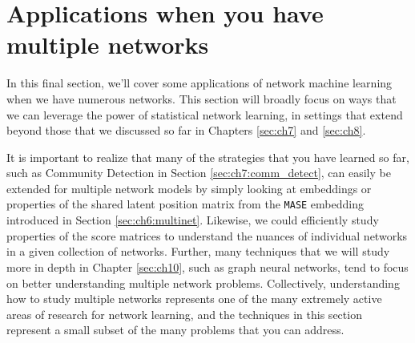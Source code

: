 \chapter{Applications when you have multiple networks}
\label{sec:ch9}

In this final section, we'll cover some applications of network machine learning when we have numerous networks. This section will broadly focus on ways that we can leverage the power of statistical network learning, in settings that extend beyond those that we discussed so far in Chapters \ref{sec:ch7} and \ref{sec:ch8}. 

It is important to realize that many of the strategies that you have learned so far, such as Community Detection in Section \ref{sec:ch7:comm_detect}, can easily be extended for multiple network models by simply looking at embeddings or properties of the shared latent position matrix from the \texttt{MASE} embedding introduced in Section \ref{sec:ch6:multinet}. Likewise, we could efficiently study properties of the score matrices to understand the nuances of individual networks in a given collection of networks. Further, many techniques that we will study more in depth in Chapter \ref{sec:ch10}, such as graph neural networks, tend to focus on better understanding multiple network problems. Collectively, understanding how to study multiple networks represents one of the many extremely active areas of research for network learning, and the techniques in this section represent a small subset of the many problems that you can address.







